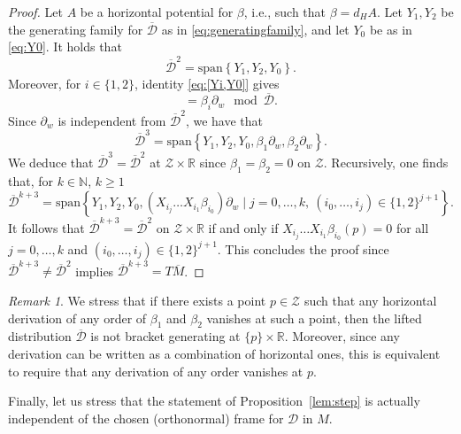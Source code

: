 \documentclass{amsart}
\theoremstyle{plain}
\theoremstyle{definition}
\theoremstyle{remark}
\newtheorem{remark}[thm]{Remark}
\newcommand{\R}{\mathbb{R}}
\newcommand{\diff}{d}%
\newcommand{\p}{\partial}												%
\newcommand{\distr}{\mathcal{D}}								%
\newcommand{\B}{\beta}
\newcommand{\lift}[1]{\overline{#1}} 							%
\begin{document}
\begin{proof}
Let $A$ be a horizontal potential for $\B$, i.e., such that $\B=\diff_H A$.
Let $Y_1,Y_2$ be the generating family for $\lift\distr$ as in \eqref{eq:generatingfamily},
and let $Y_0$ be as in \eqref{eq:Y0}.
It holds that 
\begin{equation}
	\lift\distr^2=\mathrm{span}\left\{Y_1,Y_2,Y_0\right\}.
\end{equation}
Moreover, for $i\in\{1,2\}$, identity \eqref{eq:[Yi,Y0]} gives
\begin{equation}
[Y_{i},Y_0]=\B_{i} \p_w \mod \lift\distr.
\end{equation}
Since $\p_w$ is independent from $\lift\distr^2$, we have that 
\begin{equation}
	\lift\distr^3=\mathrm{span}\left\{Y_1,Y_2,Y_0,\B_1\p_w,\B_2\p_w\right\}.
\end{equation}
We deduce that $\lift \distr^3=\lift\distr^2$ at $ \mathcal{Z}\times \R$ since $\beta_{1}=\beta_{2}=0$ on $\mathcal{Z}$. 
Recursively, one finds that, for $k\in \mathbb{N}$, $k\geq 1$
\begin{equation}
	\lift\distr^{k+3}=\mathrm{span}\left\{ Y_1,Y_2,Y_0, 
							\left(X_{i_j}\ldots X_{i_{1}}\B_{i_0}\right) \p_w 
							\mid j=0,\ldots,k, \ (i_0,\ldots,i_j)\in\{1,2\}^{j+1}
							\right\}.
\end{equation} 
It follows that $\lift\distr^{k+3}=\lift\distr^2$ on $\mathcal Z\times \R$ if and only if $X_{i_j}\ldots X_{i_{1}}\B_{i_0}(p)=0$ for all $j=0,\ldots,k$ and $ (i_0,\ldots,i_j)\in\{1,2\}^{j+1}$. This concludes the proof since $\lift\distr^{k+3}\neq \lift\distr^2$ implies $\lift\distr^{k+3}=T\lift M$.
\end{proof}


\begin{remark}
We stress that if there exists a point $p\in  \mathcal{Z}$ such that any horizontal derivation of any order of $\B_1$ and $\B_2$ vanishes at such a point, then the lifted distribution $\lift \distr$ is not bracket generating at $\{p\}\times \R$. Moreover, since any derivation can be written as a combination of horizontal ones, this is equivalent to require that any derivation of any order vanishes at $p$.

Finally, let us stress that the statement of Proposition~\ref{lem:step} is actually independent of the chosen (orthonormal) frame for $\distr$ in $M$. 
\end{remark}
\end{document}
